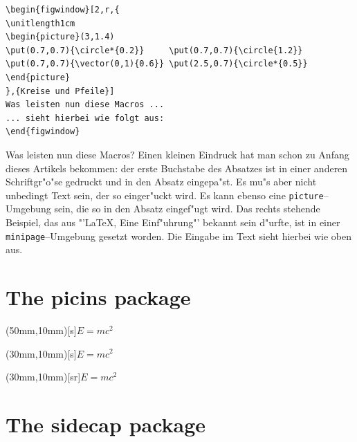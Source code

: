 \begin{verbatim}
\begin{figwindow}[2,r,{
\unitlength1cm
\begin{picture}(3,1.4)
\put(0.7,0.7){\circle*{0.2}}     \put(0.7,0.7){\circle{1.2}}
\put(0.7,0.7){\vector(0,1){0.6}} \put(2.5,0.7){\circle*{0.5}}
\end{picture}
},{Kreise und Pfeile}]
Was leisten nun diese Macros ...
... sieht hierbei wie folgt aus:
\end{figwindow}
\end{verbatim}

\begin{figwindow}
Was leisten nun diese Macros? Einen kleinen Eindruck hat man schon
zu Anfang dieses Artikels bekommen: der erste Buchstabe des Absatzes
ist in einer anderen Schriftgr"o"se gedruckt und in den Absatz eingepa"st.
Es mu"s aber nicht unbedingt Text sein, der so einger"uckt wird. Es kann
ebenso eine \verb?picture?--Umgebung sein, die so in den Absatz eingef"ugt
wird. Das rechts stehende Beispiel, das aus "'\LaTeX , Eine Einf"uhrung"'
bekannt sein d"urfte, ist in einer \verb?minipage?--Umgebung gesetzt
worden. Die Eingabe im Text sieht hierbei wie oben aus.
\end{figwindow}
\fi

\ifx\parpic\undefined \else
\clearpage
\section{The picins package}

\newcommand\FOR{\(\displaystyle E=mc^2\)}

\piccaptioninside
\parpic(50mm,10mm)[s]{\FOR}
\sample\sample\sample

\piccaptionside
{}
\parpic(30mm,10mm)[s]{\FOR}
\sample

\piccaptiontopside
{}
\parpic(30mm,10mm)[sr]{\FOR}
\sample\sample
\fi

\ifx\SCfigure\undefined \else
\clearpage
\section{The sidecap package}

